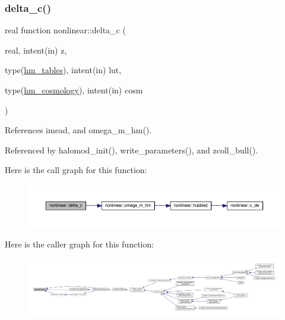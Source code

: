 \subsubsection{\texorpdfstring{delta\+\_\+c()}{delta\_c()}}
{\footnotesize\ttfamily real function nonlinear\+::delta\+\_\+c (\begin{DoxyParamCaption}\item[{real, intent(in)}]{z,  }\item[{type(\mbox{\hyperlink{structnonlinear_1_1hm__tables}{hm\+\_\+tables}}), intent(in)}]{lut,  }\item[{type(\mbox{\hyperlink{structnonlinear_1_1hm__cosmology}{hm\+\_\+cosmology}}), intent(in)}]{cosm }\end{DoxyParamCaption})\hspace{0.3cm}{\ttfamily [private]}}



References imead, and omega\+\_\+m\+\_\+hm().



Referenced by halomod\+\_\+init(), write\+\_\+parameters(), and zcoll\+\_\+bull().

Here is the call graph for this function\+:
\nopagebreak
\begin{figure}[H]
\begin{center}
\leavevmode
\includegraphics[width=350pt]{namespacenonlinear_a927f840ecd0f2086eefba9d7220e3279_cgraph}
\end{center}
\end{figure}
Here is the caller graph for this function\+:
\nopagebreak
\begin{figure}[H]
\begin{center}
\leavevmode
\includegraphics[width=350pt]{namespacenonlinear_a927f840ecd0f2086eefba9d7220e3279_icgraph}
\end{center}
\end{figure}
\mbox{\label{namespacenonlinear_a73fccef372213a59eed00701677d1cdf}} 
